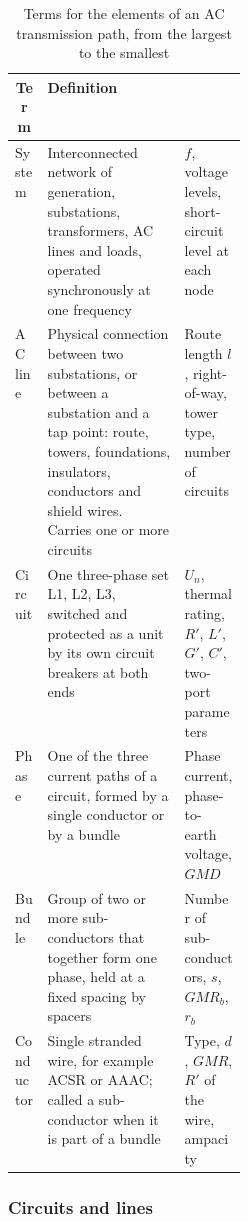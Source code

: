 \begin{table}[!ht]
  \centering
  \small
  \begin{tabularx}{\linewidth}{@{}l >{\raggedright\arraybackslash}X
                                    >{\raggedright\arraybackslash}p{0.27\linewidth}@{}}
    \toprule
    \multicolumn{1}{c}{\textbf{Term}} & \textbf{Definition}
    & \multicolumn{1}{c}{\textbf{Assigned quantities}} \\
    \midrule
    System    & Interconnected network of generation, substations,
                transformers, AC lines and loads, operated synchronously at
                one frequency
              & $f$, voltage levels, short-circuit level at each node \\
    AC line   & Physical connection between two substations, or between a
                substation and a tap point: route, towers, foundations,
                insulators, conductors and shield wires. Carries one or more
                circuits
              & Route length $l$, right-of-way, tower type, number of
                circuits \\
    Circuit   & One three-phase set L1, L2, L3, switched and protected as a
                unit by its own circuit breakers at both ends
              & $U_n$, thermal rating, $R'$, $L'$, $G'$, $C'$, two-port
                parameters \\
    Phase     & One of the three current paths of a circuit, formed by a
                single conductor or by a bundle
              & Phase current, phase-to-earth voltage, $GMD$ \\
    Bundle    & Group of two or more sub-conductors that together form one
                phase, held at a fixed spacing by spacers
              & Number of sub-conductors, $s$, $GMR_b$, $r_b$ \\
    Conductor & Single stranded wire, for example ACSR or AAAC; called a
                sub-conductor when it is part of a bundle
              & Type, $d$, $GMR$, $R'$ of the wire, ampacity \\
    \bottomrule
  \end{tabularx}
  \caption{Terms for the elements of an AC transmission path, from the
           largest to the smallest}
  \label{tab:ac-terms}
\end{table}

\subsubsection{Circuits and lines}
\label{sec:ac-terms-circuits}


